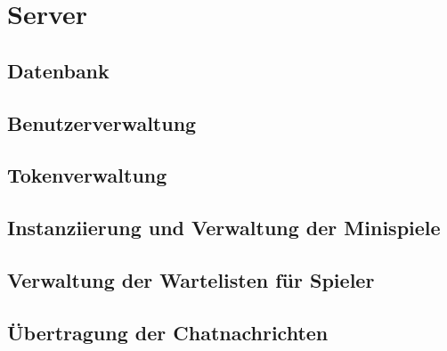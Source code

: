 \chapter{Server}
\section{Datenbank}

\section{Benutzerverwaltung}

\section{Tokenverwaltung}

\section{Instanziierung und Verwaltung der Minispiele}

\section{Verwaltung der Wartelisten für Spieler}

\section{Übertragung der Chatnachrichten}
